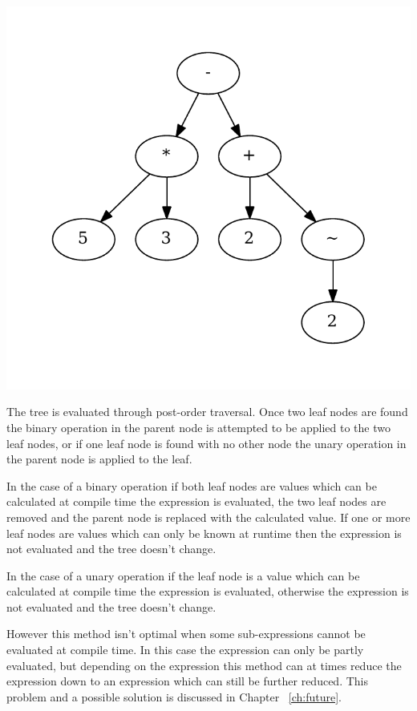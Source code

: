\begin{center}
\includegraphics[scale=0.5]{graphs/impleval.pdf}
\end{center}


The tree is evaluated through
post-order traversal. Once two leaf nodes are found the binary operation in the parent node
is attempted to be applied to the two leaf nodes, or if one leaf node is found
with no other node the unary operation in the parent node is applied
to the leaf.  

In the case of a binary operation if both leaf nodes are values which
can be calculated at compile time the expression is evaluated, the two leaf nodes
are removed and the parent node is replaced with the calculated value. If one or
more leaf nodes are values which can only be known at runtime then the expression is
not evaluated and the tree doesn't change. 

In the case of a unary operation if the leaf node is a value which can be calculated
at compile time the expression is evaluated, otherwise the expression is not evaluated
and the tree doesn't change.

However this method isn't optimal when some sub-expressions cannot be
evaluated at compile time. In this case the expression can only be partly evaluated,
but depending on the expression this method can at times reduce the expression
down to an expression which can still be further reduced.
This problem and a possible solution is discussed in Chapter ~\ref{ch:future}.



